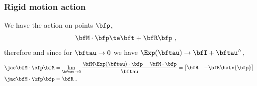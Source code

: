 \subsubsection{Rigid motion action}
\label{sec:jac_SE3_action}
%
We have the action on points $\bfp$,
%
\begin{align}
\bfM\cdot\bfp &\te \bft+\bfR\bfp
~,
\end{align}
%
therefore and since for ${\bftau}\to0$ we have $\Exp(\bftau)\to\bfI+\bftau\hhat$, 
%
\begin{align}
\mjac{\bfM\cdot\bfp}{\bfM} 
  &= 
  \lim_{\bftau\to0}\frac{\bfM\Exp(\bftau)\cdot\bfp - \bfM\cdot\bfp}{\bftau}
  = \begin{bmatrix}\bfR & -\bfR\hatx{\bfp} \end{bmatrix} \\
\mjac{\bfM\cdot\bfp}{\bfp} &= \bfR
~.
\end{align}
